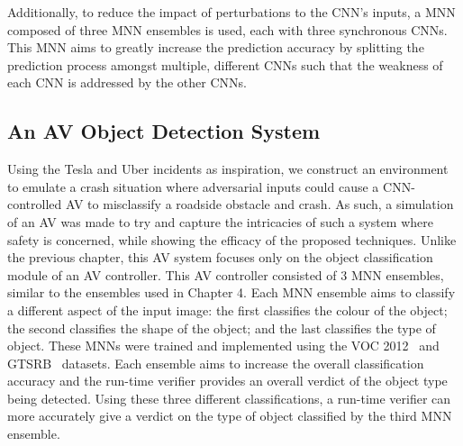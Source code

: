Additionally, to reduce the impact of perturbations to the \ac{CNN}'s inputs, a \ac{MNN} composed of three \ac{MNN} ensembles is used, each with three synchronous \acp{CNN}.
This \ac{MNN} aims to greatly increase the prediction accuracy by splitting the prediction process amongst multiple, different \acp{CNN} such that the weakness of each \ac{CNN} is addressed by the other \acp{CNN}.

\subsection{An \acf{AV} Object Detection System}
Using the Tesla and Uber incidents as inspiration, we construct an environment to emulate a crash situation where adversarial inputs could cause a \ac{CNN}-controlled \ac{AV} to misclassify a roadside obstacle and crash.
As such, a simulation of an \ac{AV} was made to try and capture the intricacies of such a system where safety is concerned, while showing the efficacy of the proposed techniques.
Unlike the previous chapter, this \ac{AV} system focuses only on the object classification module of an \ac{AV} controller.
This \ac{AV} controller consisted of 3 \ac{MNN} ensembles, similar to the ensembles used in Chapter 4.
Each \ac{MNN} ensemble aims to classify a different aspect of the input image: the first classifies the colour of the object; the second classifies the shape of the object; and the last classifies the type of object.
These \acp{MNN} were trained and implemented using the \ac{VOC} 2012~\cite{pascal-voc-2012} and \ac{GTSRB}~\cite{Stallkamp2012-gtsrb} datasets.
Each ensemble aims to increase the overall classification accuracy and the run-time verifier provides an overall verdict of the object type being detected.
Using these three different classifications, a run-time verifier can more accurately give a verdict on the type of object classified by the third \ac{MNN} ensemble.

